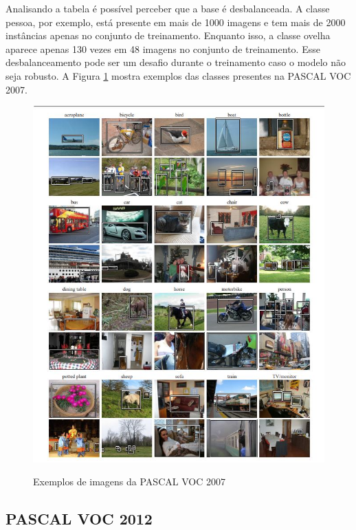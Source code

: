 Analisando a tabela é possível perceber que a base é desbalanceada. A classe pessoa, por exemplo, está presente em mais de 1000 imagens e tem mais de 2000 instâncias apenas no conjunto de treinamento. Enquanto isso, a classe ovelha aparece apenas 130 vezes em 48 imagens no conjunto de treinamento. Esse desbalanceamento pode ser um desafio durante o treinamento caso o modelo não seja robusto. A Figura \ref{fig:pascal2007} mostra exemplos das classes presentes na \ac{PASCAL VOC} 2007.

\begin{figure}[H]
	\setlength{\abovecaptionskip}{0pt}
	\setlength{\belowcaptionskip}{0pt}
	\caption[Imagens PASCAL VOC 2007]{Exemplos de imagens da PASCAL VOC 2007}
	\centering
	\includegraphics[width=.9\textwidth]{imagem/0x_pascal2007.jpg}
	\captionsetup{justification=centering}
	\label{fig:pascal2007}
\end{figure}

\subsection{PASCAL VOC 2012}
\label{section:3:4:1}

